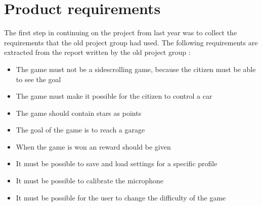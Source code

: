 \section{Product requirements}

The first step in continuing on the project from last year was to collect the requirements that the old project group had used.
The following requirements are extracted from the report written by the old project group \citet*{oldcars}:

\begin{itemize}
\item The game must not be a sidescrolling game, because the citizen must be able to see the goal
\item The game must make it possible for the citizen to control a car
\item The game should contain stars as points
\item The goal of the game is to reach a garage
\item When the game is won an reward should be given
\item It must be possible to save and load settings for a specific profile
\item It must be possible to calibrate the microphone 
\item It must be possible for the user to change the difficulty of the game  
\end{itemize}